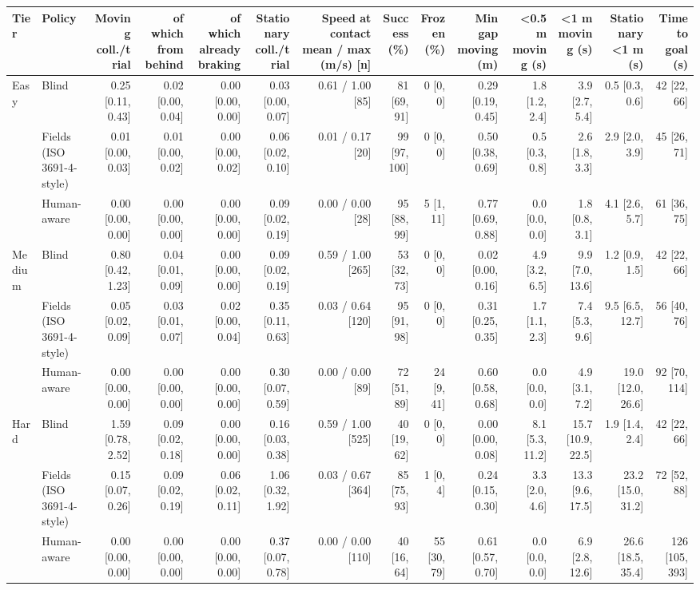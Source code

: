 \begin{tabular}{llrrrrrrrrrrrr}
\toprule
Tier & Policy & Moving coll./trial & of which from behind & of which already braking & Stationary coll./trial & Speed at contact mean / max (m/s) [n] & Success (\%) & Frozen (\%) & Min gap moving (m) & <0.5 m moving (s) & <1 m moving (s) & Stationary <1 m (s) & Time to goal (s) \\
\midrule
Easy & Blind & 0.25 [0.11, 0.43] & 0.02 [0.00, 0.04] & 0.00 [0.00, 0.00] & 0.03 [0.00, 0.07] & 0.61 / 1.00 [85] & 81 [69, 91] & 0 [0, 0] & 0.29 [0.19, 0.45] & 1.8 [1.2, 2.4] & 3.9 [2.7, 5.4] & 0.5 [0.3, 0.6] & 42 [22, 66] \\
 & Fields (ISO 3691-4-style) & 0.01 [0.00, 0.03] & 0.01 [0.00, 0.02] & 0.00 [0.00, 0.02] & 0.06 [0.02, 0.10] & 0.01 / 0.17 [20] & 99 [97, 100] & 0 [0, 0] & 0.50 [0.38, 0.69] & 0.5 [0.3, 0.8] & 2.6 [1.8, 3.3] & 2.9 [2.0, 3.9] & 45 [26, 71] \\
 & Human-aware & 0.00 [0.00, 0.00] & 0.00 [0.00, 0.00] & 0.00 [0.00, 0.00] & 0.09 [0.02, 0.19] & 0.00 / 0.00 [28] & 95 [88, 99] & 5 [1, 11] & 0.77 [0.69, 0.88] & 0.0 [0.0, 0.0] & 1.8 [0.8, 3.1] & 4.1 [2.6, 5.7] & 61 [36, 75] \\
\midrule
Medium & Blind & 0.80 [0.42, 1.23] & 0.04 [0.01, 0.09] & 0.00 [0.00, 0.00] & 0.09 [0.02, 0.19] & 0.59 / 1.00 [265] & 53 [32, 73] & 0 [0, 0] & 0.02 [0.00, 0.16] & 4.9 [3.2, 6.5] & 9.9 [7.0, 13.6] & 1.2 [0.9, 1.5] & 42 [22, 66] \\
 & Fields (ISO 3691-4-style) & 0.05 [0.02, 0.09] & 0.03 [0.01, 0.07] & 0.02 [0.00, 0.04] & 0.35 [0.11, 0.63] & 0.03 / 0.64 [120] & 95 [91, 98] & 0 [0, 0] & 0.31 [0.25, 0.35] & 1.7 [1.1, 2.3] & 7.4 [5.3, 9.6] & 9.5 [6.5, 12.7] & 56 [40, 76] \\
 & Human-aware & 0.00 [0.00, 0.00] & 0.00 [0.00, 0.00] & 0.00 [0.00, 0.00] & 0.30 [0.07, 0.59] & 0.00 / 0.00 [89] & 72 [51, 89] & 24 [9, 41] & 0.60 [0.58, 0.68] & 0.0 [0.0, 0.0] & 4.9 [3.1, 7.2] & 19.0 [12.0, 26.6] & 92 [70, 114] \\
\midrule
Hard & Blind & 1.59 [0.78, 2.52] & 0.09 [0.02, 0.18] & 0.00 [0.00, 0.00] & 0.16 [0.03, 0.38] & 0.59 / 1.00 [525] & 40 [19, 62] & 0 [0, 0] & 0.00 [0.00, 0.08] & 8.1 [5.3, 11.2] & 15.7 [10.9, 22.5] & 1.9 [1.4, 2.4] & 42 [22, 66] \\
 & Fields (ISO 3691-4-style) & 0.15 [0.07, 0.26] & 0.09 [0.02, 0.19] & 0.06 [0.02, 0.11] & 1.06 [0.32, 1.92] & 0.03 / 0.67 [364] & 85 [75, 93] & 1 [0, 4] & 0.24 [0.15, 0.30] & 3.3 [2.0, 4.6] & 13.3 [9.6, 17.5] & 23.2 [15.0, 31.2] & 72 [52, 88] \\
 & Human-aware & 0.00 [0.00, 0.00] & 0.00 [0.00, 0.00] & 0.00 [0.00, 0.00] & 0.37 [0.07, 0.78] & 0.00 / 0.00 [110] & 40 [16, 64] & 55 [30, 79] & 0.61 [0.57, 0.70] & 0.0 [0.0, 0.0] & 6.9 [2.8, 12.6] & 26.6 [18.5, 35.4] & 126 [105, 393] \\
\bottomrule
\end{tabular}
